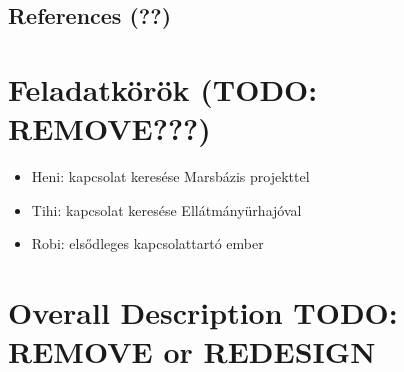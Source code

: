 \documentclass[12pt]{report}
\begin{document}
\begin{itemize}
\section{References (??)}





\chapter*{Feladatkörök (TODO: REMOVE???)}
\begin{itemize}
    \item Heni: kapcsolat keresése Marsbázis projekttel
    \item Tihi: kapcsolat keresése Ellátmányürhajóval
    \item Robi: elsődleges kapcsolattartó ember
    
\end{itemize}


\chapter{Overall Description TODO: REMOVE or REDESIGN}


\end{itemize}
\end{document}

